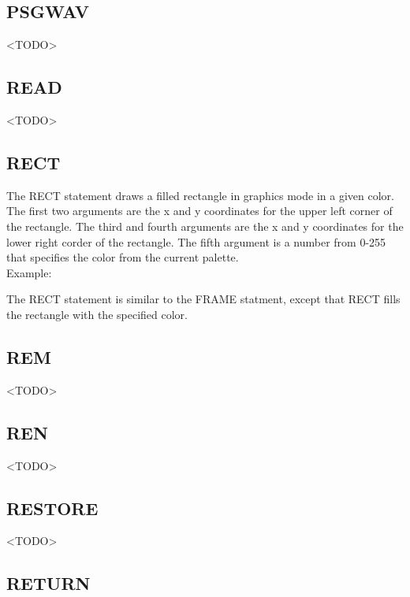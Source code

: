 \subsection{PSGWAV}

<TODO>

\subsection{READ}

<TODO>

\subsection{RECT}

The {\ttfamily RECT} statement draws a filled rectangle in graphics mode in a
given color.  The first two arguments are the x and y coordinates for the upper
left corner of the rectangle.  The third and fourth arguments are the x and y
coordinates for the lower right corder of the rectangle.  The fifth argument is
a number from 0-255 that specifies the color from the current palette.\\

Example:\\


The {\ttfamily RECT} statement is similar to the {\ttfamily FRAME} statment,
except that {\ttfamily RECT} fills the rectangle with the specified color.

\subsection{REM}

<TODO>

\subsection{REN}

<TODO>

\subsection{RESTORE}

<TODO>

\subsection{RETURN}


